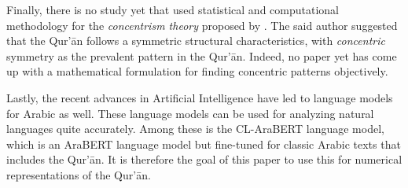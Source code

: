 Finally, there is no study yet that used statistical and computational methodology for the \textit{concentrism theory} proposed by . The said author suggested that the Qur'\=an follows a symmetric structural characteristics, with \textit{concentric} symmetry as the prevalent pattern in the Qur'\=an. Indeed, no paper yet has come up with a mathematical formulation for finding concentric patterns objectively.

Lastly, the recent advances in Artificial Intelligence have led to language models for Arabic as well. These language models can be used for analyzing natural languages quite accurately. Among these is the CL-AraBERT language model, which is an AraBERT language model but fine-tuned for classic Arabic texts that includes the Qur'\=an. It is therefore the goal of this paper to use this for numerical representations of the Qur'\=an.
